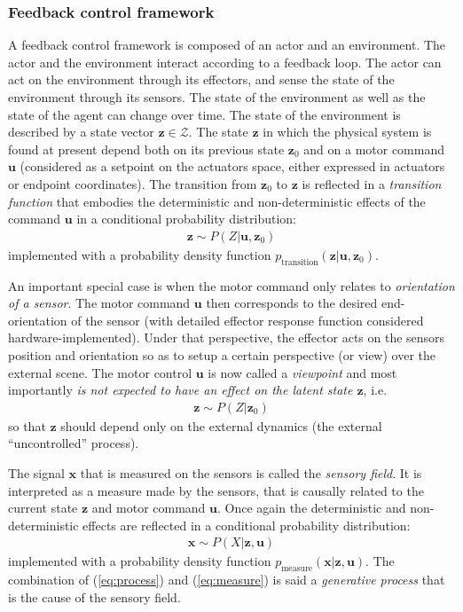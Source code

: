 \documentclass{article}
\begin{document}
\subsubsection{Feedback control framework}
A feedback control framework is composed of an actor and an environment. The actor and the environment interact according to a feedback loop. 
The actor can act on the environment through its effectors, and sense the state of the environment through its sensors. 
The state of the environment as well as the state of the agent can change over time. The state of the environment is described by a state vector $\boldsymbol{z} \in \mathcal{Z}$.
The state $\boldsymbol{z}$ in which the physical system is found at present depend both on its previous state $\boldsymbol{z}_0$ and on a motor command $\boldsymbol{u}$ (considered as a setpoint on the actuators space, either expressed in actuators or endpoint coordinates). The transition from $\boldsymbol{z}_0$ to $\boldsymbol{z}$ is reflected in a \emph{transition function} that embodies the deterministic and non-deterministic effects of the command $\boldsymbol{u}$ in a conditional probability distribution:  
\begin{align}
\boldsymbol{z} \sim P(Z|\boldsymbol{u},\boldsymbol{z}_0) \label{eq:process}
\end{align}
implemented with a probability density function $p_\text{transition}(\boldsymbol{z}|\boldsymbol{u},\boldsymbol{z}_0)$.

An important special case is when the motor command only relates to \emph{orientation of a sensor}. The motor command $\boldsymbol{u}$ then corresponds to the desired end-orientation of the sensor (with detailed effector response function considered  hardware-implemented).  
Under that perspective, the effector acts on the sensors position and orientation so as to setup a certain perspective (or view) over the external scene. The motor control $\boldsymbol{u}$ is now called a \emph{viewpoint} and most importantly \emph{is not expected to have an effect on the latent state $\boldsymbol{z}$}, i.e.
\begin{align}
\boldsymbol{z} \sim P(Z|\boldsymbol{z}_0)
\end{align} 
so that $\boldsymbol{z}$ should depend only on the external dynamics (the external ``uncontrolled'' process).

The signal $\boldsymbol{x}$ that is measured on the sensors is called the \emph{sensory field}. It is interpreted as a measure made by the sensors, that is causally related to the current state $\boldsymbol{z}$ and motor command $\boldsymbol{u}$. Once again the deterministic and non-deterministic effects are reflected in a conditional probability distribution:
\begin{align}
\boldsymbol{x} \sim P(X|\boldsymbol{z},\boldsymbol{u})\label{eq:measure}
\end{align}
implemented with a probability density function $p_\text{measure}(\boldsymbol{x}|\boldsymbol{z},\boldsymbol{u})$.
The combination of  (\ref{eq:process}) and (\ref{eq:measure}) is said a \emph{generative process} that is the cause of the sensory field. 
\end{document}
